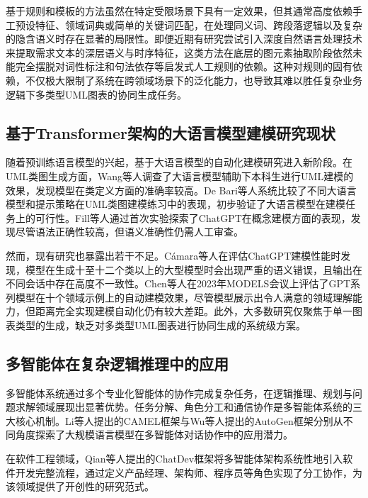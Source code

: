 基于规则和模板的方法虽然在特定受限场景下具有一定效果，但其通常高度依赖手工预设特征、领域词典或简单的关键词匹配，在处理同义词、跨段落逻辑以及复杂的隐含语义时存在显著的局限性\cite{meng2024automated, abdelnabi2020generating, zhaohuipan2021}。即便近期有研究尝试引入深度自然语言处理技术来提取需求文本的深层语义与时序特征，这类方法在底层的图元素抽取阶段依然未能完全摆脱对词性标注和句法依存等启发式人工规则的依赖\cite{yuan2026automatedadgc}。这种对规则的固有依赖，不仅极大限制了系统在跨领域场景下的泛化能力，也导致其难以胜任复杂业务逻辑下多类型UML图表的协同生成任务。

\subsection{基于Transformer架构的大语言模型建模研究现状}

随着预训练语言模型的兴起，基于大语言模型的自动化建模研究进入新阶段。在UML类图生成方面，Wang等人\cite{wang2024llms}调查了大语言模型辅助下本科生进行UML建模的效果，发现模型在类定义方面的准确率较高。De Bari等人\cite{debari2024evaluating}系统比较了不同大语言模型和提示策略在UML类图建模练习中的表现，初步验证了大语言模型在建模任务上的可行性。Fill等人\cite{fill2023conceptual}通过首次实验探索了ChatGPT在概念建模方面的表现，发现尽管语法正确性较高，但语义准确性仍需人工审查。

然而，现有研究也暴露出若干不足。Cámara等人\cite{camara2023assessment}在评估ChatGPT建模性能时发现，模型在生成十至十二个类以上的大型模型时会出现严重的语义错误，且输出在不同会话中存在高度不一致性。Chen等人\cite{chen2023automated}在2023年MODELS会议上评估了GPT系列模型在十个领域示例上的自动建模效果，尽管模型展示出令人满意的领域理解能力，但距离完全实现建模自动化仍有较大差距。此外，大多数研究仅聚焦于单一图表类型的生成，缺乏对多类型UML图表进行协同生成的系统级方案\cite{giannouris2025nomad,nguyen2026class}。

\subsection{多智能体在复杂逻辑推理中的应用}

多智能体系统通过多个专业化智能体的协作完成复杂任务，在逻辑推理、规划与问题求解领域展现出显著优势。任务分解、角色分工和通信协作是多智能体系统的三大核心机制。Li等人\cite{li2023camel}提出的CAMEL框架与Wu等人\cite{wu2023autogen}提出的AutoGen框架分别从不同角度探索了大规模语言模型在多智能体对话协作中的应用潜力。

在软件工程领域，Qian等人\cite{qian2023chatdev}提出的ChatDev框架将多智能体架构系统性地引入软件开发完整流程，通过定义产品经理、架构师、程序员等角色实现了分工协作，为该领域提供了开创性的研究范式。

